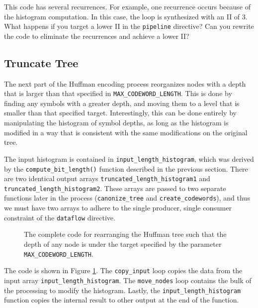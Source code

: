 \begin{exercise}
This code has several recurrences.  For example, one recurrence occurs because of the histogram computation.  In this case, the loop is synthesized with an II of 3.  What happens if you target a lower II in the \lstinline{pipeline} directive?  Can you rewrite the code to eliminate the recurrences and achieve a lower II?
\end{exercise}

\subsection{Truncate Tree}
\label{sec:huffman_truncate_tree}

The next part of the Huffman encoding process reorganizes nodes with a depth that is larger than that specified in \lstinline{MAX_CODEWORD_LENGTH}. This is done by finding any symbols with a greater depth, and moving them to a level that is smaller than that specified target.   Interestingly, this can be done entirely by manipulating the histogram of symbol depths, as long as the histogram is modified in a way that is consistent with the same modifications on the original tree.


The input histogram is contained in \lstinline{input_length_histogram}, which was derived by the \lstinline{compute_bit_length()} function described in the previous section. There are two identical output arrays \lstinline{truncated_length_histogram1} and \lstinline{truncated_length_histogram2}. These arrays are passed to two separate functions later in the process (\lstinline{canonize_tree} and \lstinline{create_codewords}), and thus we must have two arrays to adhere to the single producer, single consumer constraint of the \lstinline{dataflow} directive.

\begin{figure}
{\tiny }
\end{figure}
\begin{figure}
{\footnotesize }
\caption{The complete code for rearranging the Huffman tree such that the depth of any node is under the target specified by the parameter \lstinline{MAX_CODEWORD_LENGTH}. }
\label{fig:huffman_truncate_tree.cpp}
\end{figure}

The code is shown in Figure \ref{fig:huffman_truncate_tree.cpp}. The \lstinline{copy_input} loop copies the data from the input array \lstinline{input_length_histogram}. The \lstinline{move_nodes} loop contains the bulk of the processing to modify the histogram.  Lastly, the \lstinline{input_length_histogram} function copies the internal result to other output at the end of the function. 

